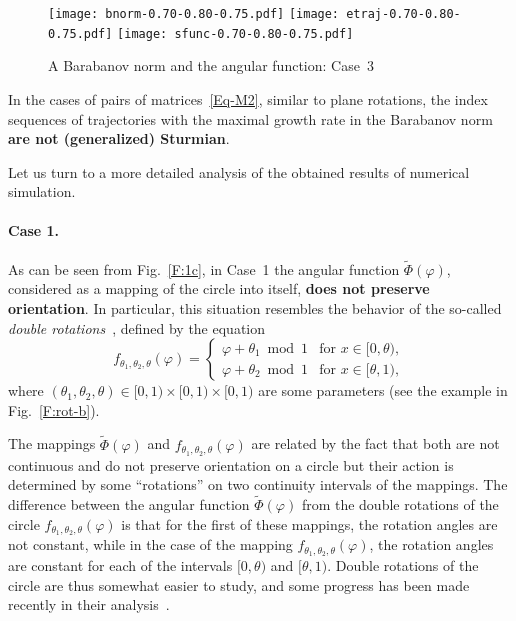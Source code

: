 \documentclass[a4paper,10pt,reqno]{amsart}
\let\cite\citep
\begin{document}
\begin{figure}[htbp!]
\centering \mbox{}\hfill{}
{\texttt{[image: bnorm-0.70-0.80-0.75.pdf]}}
\hfill{}
{\texttt{[image: etraj-0.70-0.80-0.75.pdf]}}
\hfill{}
{\texttt{[image: sfunc-0.70-0.80-0.75.pdf]}}
\hfill\mbox{} \caption{A Barabanov norm and the angular function:
Case~3}\label{F:3}
\end{figure}

\begin{mainclaim}
\makeatletter{}\makeatother%
\label{P:main}%
In the cases of pairs of matrices~\eqref{Eq-M2}, similar to plane rotations,
the index sequences of trajectories with the maximal growth rate in the
Barabanov norm \textbf{are not (generalized) Sturmian}.
\end{mainclaim}

Let us turn to a more detailed analysis of the obtained results of numerical
simulation.

\paragraph{Case 1.} As can be seen from Fig.~\ref{F:1c}, in Case~1 the
angular function $\tilde{\varPhi}(\varphi)$, considered as a mapping of the
circle into itself, \textbf{does not preserve orientation}. In particular,
this situation resembles the behavior of the so-called \emph{double
rotations}~\cite{SIA:DCDS05, Clack:13, AFHS:ArXiv21, Kryzhevich:MMNP21},
defined by the equation
\begin{equation}\label{E:doublerot}
f_{\theta_{1},\theta_{2},\theta}(\varphi) =
\begin{cases}
\varphi + \theta_{1}\bmod1& \text{for~}x\in [0, \theta),\\
\varphi + \theta_{2}\bmod1& \text{for~}x\in [\theta, 1),
\end{cases}
\end{equation}
where $(\theta_{1}, \theta_{2}, \theta)\in [0, 1)\times [0, 1)\times [0, 1)$
are some parameters (see the example in Fig.~\ref{F:rot-b}).

The mappings $\tilde{\varPhi}(\varphi)$ and
$f_{\theta_{1},\theta_{2},\theta}(\varphi)$ are related by the fact that both
are not continuous and do not preserve orientation on a circle but their
action is determined by some ``rotations'' on two continuity intervals of the
mappings. The difference between the angular function
$\tilde{\varPhi}(\varphi)$ from the double rotations of the circle
$f_{\theta_{1},\theta_{2},\theta}(\varphi)$ is that for the first of these
mappings, the rotation angles are not constant, while in the case of the
mapping $f_{\theta_{1},\theta_{2},\theta}(\varphi)$, the rotation angles are
constant for each of the intervals $[0, \theta)$ and $[\theta, 1)$. Double
rotations of the circle are thus somewhat easier to study, and some progress
has been made recently in their analysis~\cite{SIA:DCDS05, Clack:13,
AFHS:ArXiv21}.
\end{document}
